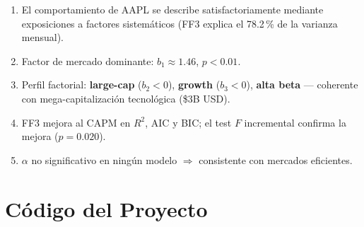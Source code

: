 \documentclass[12pt,letterpaper]{article}
\begin{document}
\begin{enumerate}
  \item El comportamiento de AAPL se describe satisfactoriamente mediante
    exposiciones a factores sistem\'aticos (FF3 explica el 78.2\,\% de la
    varianza mensual).
  \item Factor de mercado dominante: $b_1 \approx 1.46$, $p<0.01$.
  \item Perfil factorial: \textbf{large-cap} ($b_2<0$), \textbf{growth}
    ($b_3<0$), \textbf{alta beta} --- coherente con mega-capitalizaci\'on
    tecnol\'ogica (\$3B USD).
  \item FF3 mejora al CAPM en $R^2$, AIC y BIC; el test $F$ incremental
    confirma la mejora ($p=0.020$).
  \item $\alpha$ no significativo en ning\'un modelo $\Rightarrow$ consistente
    con mercados eficientes.
\end{enumerate}

\section{C\'odigo del Proyecto}
\end{document}
